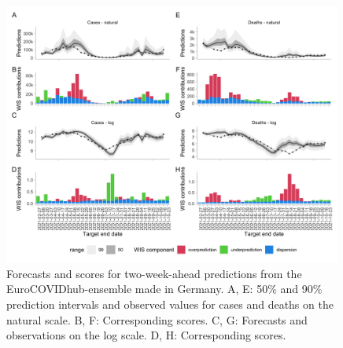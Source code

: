 \documentclass{article}
\begin{document}
\begin{figure}[h!]
    \centering
    \includegraphics[width=0.99\textwidth]{output/figures/HUB-model-comparison-epinow.png}
    \caption{
    Forecasts and scores for two-week-ahead predictions from the EuroCOVIDhub-ensemble made in Germany. A, E: 50\% and 90\% prediction intervals and observed values for cases and deaths on the natural scale. B, F: Corresponding scores. C, G: Forecasts and observations on the log scale. D, H: Corresponding scores. 
    }
    \label{fig:HUB-model-comparison-epinow}
\end{figure}

\clearpage

\end{document}
